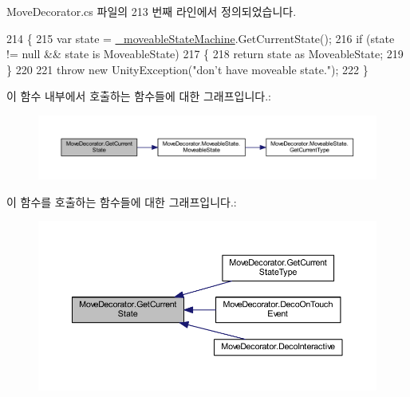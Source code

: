Move\+Decorator.\+cs 파일의 213 번째 라인에서 정의되었습니다.


\begin{DoxyCode}
214     \{
215         var state = \hyperlink{class_move_decorator_a699616462ff8c3f628be94d157064c79}{\_moveableStateMachine}.GetCurrentState();
216         \textcolor{keywordflow}{if} (state != null && state is MoveableState)
217         \{
218             \textcolor{keywordflow}{return} state as MoveableState;
219         \}
220 
221         \textcolor{keywordflow}{throw} \textcolor{keyword}{new} UnityException(\textcolor{stringliteral}{"don't have moveable state."});
222     \}
\end{DoxyCode}


이 함수 내부에서 호출하는 함수들에 대한 그래프입니다.\+:\nopagebreak
\begin{figure}[H]
\begin{center}
\leavevmode
\includegraphics[width=350pt]{class_move_decorator_ad6f988cbbd3dce9e33bb0c08609f012f_cgraph}
\end{center}
\end{figure}




이 함수를 호출하는 함수들에 대한 그래프입니다.\+:
\nopagebreak
\begin{figure}[H]
\begin{center}
\leavevmode
\includegraphics[width=350pt]{class_move_decorator_ad6f988cbbd3dce9e33bb0c08609f012f_icgraph}
\end{center}
\end{figure}


